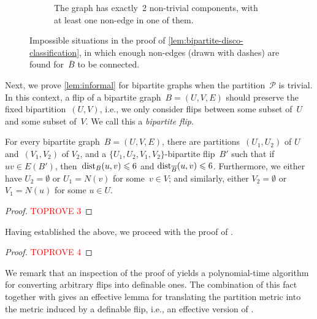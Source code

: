 \documentclass[a4paper,UKenglish,cleveref, autoref, thm-restate]{lipics-v2021}
\newcommand{\dist}{\textnormal{dist}}
\newcommand{\PP}{\mathcal{P}}
\renewcommand{\le}{\leqslant}
\begin{document}
\begin{figure}[ht]
\begin{subfigure}[t]{0.3\textwidth}
    \caption{The graph has exactly~2 non-trivial components, with at least one non-edge in one of them.}
    \label{subfig:non-complete-component}
  \end{subfigure}

  \caption{Impossible situations in the proof of \cref{lem:bipartite-disco-classification},
    in which enough non-edges (drawn with dashes) are found for~$\overline{B}$ to be connected.
  }
\end{figure}

Next, we prove \cref{lem:informal} for bipartite graphs when the partition~$\PP$ is trivial.
In this context, a flip of a bipartite graph~$B = (U,V,E)$ should preserve the fixed bipartition~$(U,V)$,
i.e., we only consider flips between some subset of~$U$ and some subset of~$V$.
We call this a \emph{bipartite flip}.
\begin{lemma}
  \label{lem:informal-bipartite}
  For every bipartite graph~$B = (U,V,E)$, there are partitions~$(U_1,U_2)$ of $U$ and~$(V_1,V_2)$ of $V_2$,
  and a $\{U_1,U_2,V_1,V_2\}$-bipartite flip~$B'$ such that if~$uv \in E(B')$, then~$\dist_B(u,v) \le \diamBoundBip$ and $\dist_{\overline{B}}(u,v) \le \diamBoundBip$.
  Furthermore, we either have $U_2=\emptyset$ or $U_1 = N(v)$ for some~$v \in V$; and similarly, either $V_2=\emptyset$ or $V_1=N(u)$ for some $u\in U$.
\end{lemma}
\begin{proof}\textcolor{red}{TOPROVE 3}\end{proof}

Having established the above, we proceed with the proof of . 

\begin{proof}\textcolor{red}{TOPROVE 4}\end{proof}

We remark that an inspection of the proof of  yields a polynomial-time algorithm for converting arbitrary flips into definable ones. The combination of this fact together with  gives an effective lemma for translating the partition metric into the metric induced by a definable flip, i.e., an effective version of . 
\end{document}
